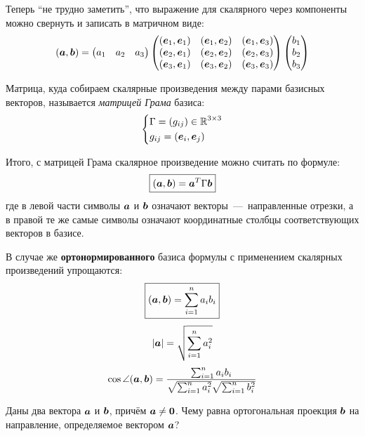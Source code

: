 \documentclass[a4paper,12pt]{article}
\begin{document}
\begin{solution}
    Теперь ``не трудно заметить'', что выражение для скалярного через компоненты можно свернуть и записать в матричном виде:
    \[
      (\boldsymbol a, \boldsymbol b) = \begin{pmatrix}
          a_1 & a_2 & a_3
        \end{pmatrix} \begin{pmatrix}
          (\boldsymbol e_1, \boldsymbol e_1) & (\boldsymbol e_1, \boldsymbol e_2) & (\boldsymbol e_1, \boldsymbol e_3)\\
          (\boldsymbol e_2, \boldsymbol e_1) & (\boldsymbol e_2, \boldsymbol e_2) & (\boldsymbol e_2, \boldsymbol e_3)\\
          (\boldsymbol e_3, \boldsymbol e_1) & (\boldsymbol e_3, \boldsymbol e_2) & (\boldsymbol e_3, \boldsymbol e_3)
        \end{pmatrix}
        \begin{pmatrix}
          b_1 \\ b_2 \\ b_3
        \end{pmatrix}
    \]
        
    Матрица, куда собираем скалярные произведения между парами базисных векторов, называется \emph{матрицей Грама} базиса:
    \[
      \left\{
        \begin{aligned}
          &\Gamma \hm= (g_{ij}) \in \RR^{3\times 3}\\
          &g_{ij} = (\bds e_i, \bds e_j)
        \end{aligned}
      \right.
    \]
    
    Итого, с матрицей Грама скалярное произведение можно считать по формуле:
    \[
      \boxed{(\boldsymbol a, \boldsymbol b) = \boldsymbol a^T \Gamma \boldsymbol b}
    \]
    где в левой части символы $\boldsymbol a$ и $\boldsymbol b$ означают векторы~---~направленные отрезки, а в правой те же самые символы означают координатные столбцы соответствующих векторов в базисе.
  \end{solution}
  
  
  В случае же \textbf{ортонормированного} базиса формулы с применением скалярных произведений упрощаются:
  \begin{equation}\label{eq:scalar-product-simplified}
    \boxed{(\boldsymbol a, \boldsymbol b) = \sum_{i=1}^n a_i b_i}
  \end{equation}
  \[
    |\boldsymbol a| = \sqrt{\sum_{i=1}^n a_i^2}
  \]
  \[
    \cos\angle(\boldsymbol a, \boldsymbol b) = \frac{\sum_{i=1}^n a_i b_i}{\sqrt{\sum_{i=1}^n a_i^2} \sqrt{\sum_{i=1}^n b_i^2}}
  \]
  
  
  \begin{problem}[2.24]
    Даны два вектора $\boldsymbol a$ и $\boldsymbol b$, причём $\bds a \hm{\not=} \bds 0$.
    Чему равна ортогональная проекция $\boldsymbol b$ на направление, определяемое вектором $\boldsymbol a$?
  \end{problem}
  
\end{document}
